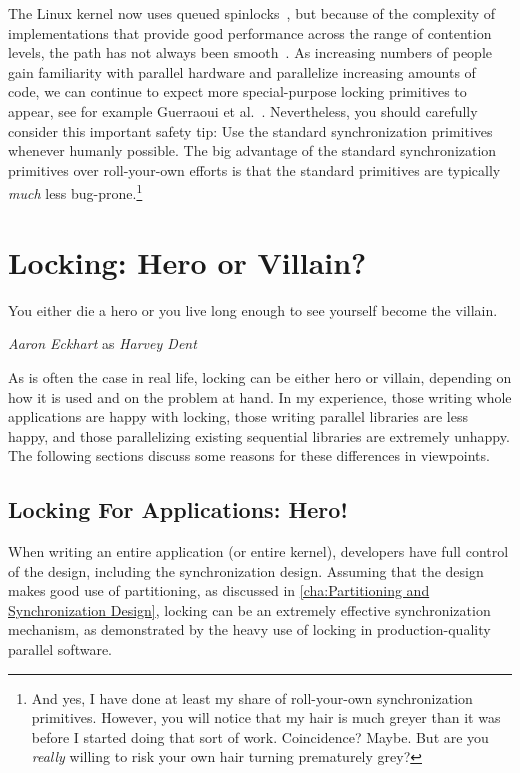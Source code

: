 The Linux kernel now uses queued spinlocks~\cite{JonathanCorbet2014qspinlocks},
but because of the complexity of implementations that provide good
performance across the range of contention levels, the path has not
always been smooth~\cite{CatalinMarinas2018qspinlockTLA,WillDeacon2018qspinlock}.
As increasing numbers of people gain familiarity with parallel hardware
and parallelize increasing amounts of code, we can continue to expect more
special-purpose locking primitives to appear, see for example Guerraoui et
al.~\cite{Guerraoui:2019:LPA:3319851.3301501,HugoGuirouxPhD}.
Nevertheless, you should carefully consider this important safety tip:
Use the standard synchronization primitives whenever humanly possible.
The big advantage of the standard synchronization primitives over
roll-your-own efforts is that the standard primitives are typically
\emph{much} less bug-prone.\footnote{
	And yes, I have done at least my share of roll-your-own
	synchronization primitives.
	However, you will notice that my hair is much greyer than
	it was before I started doing that sort of work.
	Coincidence?
	Maybe.
	But are you \emph{really} willing to risk your own hair turning
	prematurely grey?}



\section{Locking: Hero or Villain?}
\label{sec:locking:Locking: Hero or Villain?}
%
\epigraph{You either die a hero or you live long enough to see yourself
	  become the villain.}
	 {\emph{Aaron Eckhart} as \emph{Harvey Dent}}

As is often the case in real life, locking can be either hero or villain,
depending on how it is used and on the problem at hand.
In my experience, those writing whole applications are happy with
locking, those writing parallel libraries are less happy, and those
parallelizing existing sequential libraries are extremely unhappy.
The following sections discuss some reasons for these differences in
viewpoints.

\subsection{Locking For Applications: Hero!}
\label{sec:locking:Locking For Applications: Hero!}

When writing an entire application (or entire kernel), developers have
full control of the design, including the synchronization design.
Assuming that the design makes good use of partitioning, as discussed in
\cref{cha:Partitioning and Synchronization Design}, locking
can be an extremely effective synchronization mechanism, as demonstrated
by the heavy use of locking in production-quality parallel software.

